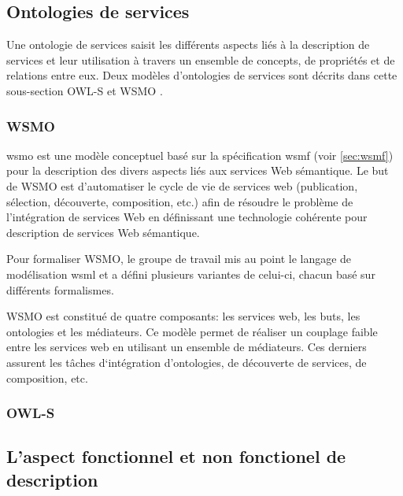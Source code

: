   \subsection{Ontologies de services}
  \label{sec:ont-services}

  Une ontologie de services saisit les différents aspects liés à la
  description de services et leur utilisation à travers un ensemble
  de concepts, de propriétés et de relations entre eux. Deux modèles
  d'ontologies de services sont décrits dans cette sous-section
  \textsc{OWL-S} et \textsc{WSMO} \cite{elie2010}.

    \subsubsection{WSMO}
    \label{sec:wsmo}

    \acrshort{wsmo} \cite{de2005web} est une modèle conceptuel basé
    sur la spécification \acrshort{wsmf} \cite{fensel2002web} (voir
    \ref{sec:wsmf}) pour la description des divers aspects liés aux
    services Web sémantique. Le but de \textsc{WSMO} est d'automatiser
    le cycle de vie de services web (publication, sélection,
    découverte, composition, etc.) afin de résoudre le problème de
    l'intégration de services Web en définissant une technologie
    cohérente pour description de services Web sémantique.

    Pour formaliser \textsc{WSMO}, le groupe de travail mis au point
    le langage de modélisation \acrshort{wsml} \cite{de2006web} et a
    défini plusieurs variantes de celui-ci, chacun basé sur différents
    formalismes.

    \textsc{WSMO} est constitué de quatre composants: les services
    web, les buts, les ontologies et les médiateurs. Ce modèle permet
    de réaliser un couplage faible entre les services web en utilisant
    un ensemble de médiateurs. Ces derniers assurent les tâches
    d‘intégration d'ontologies, de découverte de services, de
    composition, etc.

    \subsubsection{OWL-S}
    \label{sec:owl-s-1}

  \subsection{L'aspect fonctionnel et non fonctionel de description}
  \label{sec:func-vs-non-func}
  {\color{red}
    \cite{el2014cbr4wsd}
  }

